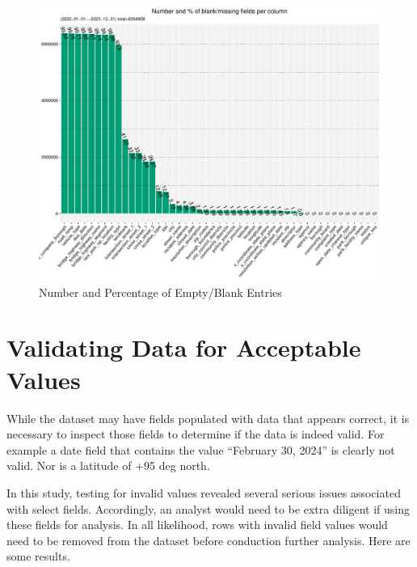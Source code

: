 \documentclass[12pt, titlepage]{article}
\begin{document}
\begin{figure}[tbp]
	\centering
  	\includegraphics[width=\textwidth]{BlankFields.pdf}
	\caption{Number and Percentage of Empty/Blank Entries}
	\label{fig:blank_fields}
\end{figure}



 \section{Validating Data for Acceptable Values}\label{sec:domain}
 While the dataset may have fields populated with data that appears correct, 
 it is necessary to inspect those fields to determine if the data is indeed valid. 
 For example a date field that contains the value ``February 30, 2024'' is 
 clearly not valid. Nor is a latitude of +95 deg north. 
 
 In this study, testing for invalid values revealed several serious issues 
 associated with select fields. Accordingly, an analyst would need to be 
 extra diligent if using these fields for analysis. In all likelihood, 
 rows with invalid field values would  need to be removed from the 
 dataset before conduction further analysis. Here are some results.
\end{document}
